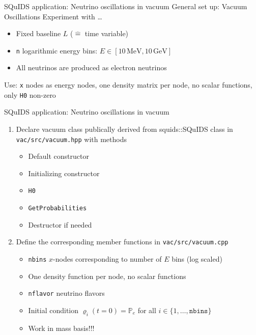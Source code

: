\documentclass[]{beamer}
\begin{document}
\begin{frame}
\end{frame}

\begin{frame}{SQuIDS application: Neutrino oscillations in vacuum}
  General set up: Vacuum Oscillations Experiment with \ldots
  \begin{itemize}
    \item Fixed baseline \(L\) (\(\hat{=}\) time variable)
    \item \texttt{n} logarithmic energy bins: \(E \in [10\,\mathrm{MeV}, 10\,\mathrm{GeV}]\)
    \item All neutrinos are produced as electron neutrinos
  \end{itemize}
  Use: \texttt{x} nodes as energy nodes, one density matrix per node, no scalar functions, only \texttt{H0} non-zero
\end{frame}

\begin{frame}{SQuIDS application: Neutrino oscillations in vacuum}
  \begin{enumerate}
    \item Declare vacuum class publically derived from squids::SQuIDS class in \texttt{vac/src/vacuum.hpp} with methods
    \begin{itemize}
      \item Default constructor
      \item Initializing constructor
      \item \texttt{H0}
      \item \texttt{GetProbabilities}
      \item Destructor if needed
    \end{itemize}
    \item Define the corresponding member functions in \texttt{vac/src/vacuum.cpp}
    \begin{itemize}
      \item \texttt{nbins} \(x\)-nodes corresponding to number of \(E\) bins (log scaled)
      \item One density function per node, no scalar functions
      \item \texttt{nflavor} neutrino flavors
      \item Initial condition \(\varrho_i(t = 0) = \mathbb{P}_{e}\) for all \(i \in \{1, \ldots,\texttt{nbins}\}\)
      \item Work in mass basis!!!
    \end{itemize}
  \end{enumerate}
\end{frame}
\end{document}
